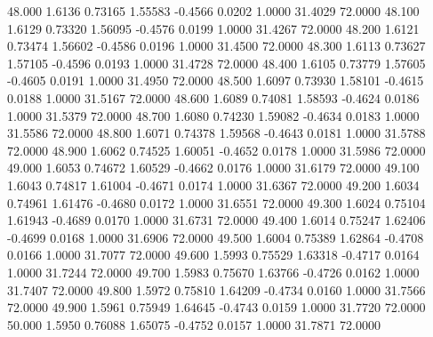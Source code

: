   48.000   1.6136   0.73165   1.55583  -0.4566   0.0202   1.0000  31.4029  72.0000
  48.100   1.6129   0.73320   1.56095  -0.4576   0.0199   1.0000  31.4267  72.0000
  48.200   1.6121   0.73474   1.56602  -0.4586   0.0196   1.0000  31.4500  72.0000
  48.300   1.6113   0.73627   1.57105  -0.4596   0.0193   1.0000  31.4728  72.0000
  48.400   1.6105   0.73779   1.57605  -0.4605   0.0191   1.0000  31.4950  72.0000
  48.500   1.6097   0.73930   1.58101  -0.4615   0.0188   1.0000  31.5167  72.0000
  48.600   1.6089   0.74081   1.58593  -0.4624   0.0186   1.0000  31.5379  72.0000
  48.700   1.6080   0.74230   1.59082  -0.4634   0.0183   1.0000  31.5586  72.0000
  48.800   1.6071   0.74378   1.59568  -0.4643   0.0181   1.0000  31.5788  72.0000
  48.900   1.6062   0.74525   1.60051  -0.4652   0.0178   1.0000  31.5986  72.0000
  49.000   1.6053   0.74672   1.60529  -0.4662   0.0176   1.0000  31.6179  72.0000
  49.100   1.6043   0.74817   1.61004  -0.4671   0.0174   1.0000  31.6367  72.0000
  49.200   1.6034   0.74961   1.61476  -0.4680   0.0172   1.0000  31.6551  72.0000
  49.300   1.6024   0.75104   1.61943  -0.4689   0.0170   1.0000  31.6731  72.0000
  49.400   1.6014   0.75247   1.62406  -0.4699   0.0168   1.0000  31.6906  72.0000
  49.500   1.6004   0.75389   1.62864  -0.4708   0.0166   1.0000  31.7077  72.0000
  49.600   1.5993   0.75529   1.63318  -0.4717   0.0164   1.0000  31.7244  72.0000
  49.700   1.5983   0.75670   1.63766  -0.4726   0.0162   1.0000  31.7407  72.0000
  49.800   1.5972   0.75810   1.64209  -0.4734   0.0160   1.0000  31.7566  72.0000
  49.900   1.5961   0.75949   1.64645  -0.4743   0.0159   1.0000  31.7720  72.0000
  50.000   1.5950   0.76088   1.65075  -0.4752   0.0157   1.0000  31.7871  72.0000

